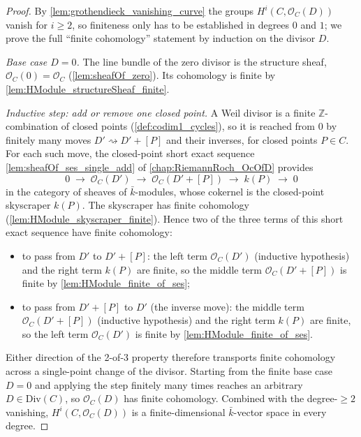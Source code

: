 \begin{proof}
  By \cref{lem:grothendieck_vanishing_curve} the groups
  \(H^i(C, \mathcal O_C(D))\) vanish for \(i \ge 2\), so finiteness
  only has to be established in degrees \(0\) and \(1\); we prove the
  full ``finite cohomology'' statement by induction on the divisor
  \(D\).

  \emph{Base case \(D = 0\).} The line bundle of the zero divisor is the
  structure sheaf, \(\mathcal O_C(0) = \mathcal O_C\)
  (\cref{lem:sheafOf_zero}). Its cohomology is finite by
  \cref{lem:HModule_structureSheaf_finite}.

  \emph{Inductive step: add or remove one closed point.} A Weil divisor
  is a finite \(\mathbb Z\)-combination of closed points
  (\cref{def:codim1_cycles}), so it is reached from \(0\) by finitely
  many moves \(D' \rightsquigarrow D' + [P]\) and their inverses, for
  closed points \(P \in C\). For each such move, the closed-point short
  exact sequence \cref{lem:sheafOf_ses_single_add} of
  \cref{chap:RiemannRoch_OcOfD} provides
  \[
    0 \;\longrightarrow\; \mathcal O_C(D')
    \;\longrightarrow\; \mathcal O_C(D' + [P])
    \;\longrightarrow\; k(P)
    \;\longrightarrow\; 0
  \]
  in the category of sheaves of \(\bar k\)-modules, whose cokernel is
  the closed-point skyscraper \(k(P)\). The skyscraper has finite
  cohomology (\cref{lem:HModule_skyscraper_finite}). Hence two of the
  three terms of this short exact sequence have finite cohomology:
  \begin{itemize}
    \item to pass from \(D'\) to \(D' + [P]\): the left term
      \(\mathcal O_C(D')\) (inductive hypothesis) and the right term
      \(k(P)\) are finite, so the middle term
      \(\mathcal O_C(D' + [P])\) is finite by
      \cref{lem:HModule_finite_of_ses};
    \item to pass from \(D' + [P]\) to \(D'\) (the inverse move): the
      middle term \(\mathcal O_C(D' + [P])\) (inductive hypothesis) and
      the right term \(k(P)\) are finite, so the left term
      \(\mathcal O_C(D')\) is finite by
      \cref{lem:HModule_finite_of_ses}.
  \end{itemize}
  Either direction of the 2-of-3 property therefore transports finite
  cohomology across a single-point change of the divisor. Starting from
  the finite base case \(D = 0\) and applying the step finitely many
  times reaches an arbitrary \(D \in \mathrm{Div}(C)\), so
  \(\mathcal O_C(D)\) has finite cohomology. Combined with the
  degree-\(\ge 2\) vanishing, \(H^i(C, \mathcal O_C(D))\) is a
  finite-dimensional \(\bar k\)-vector space in every degree.
\end{proof}

